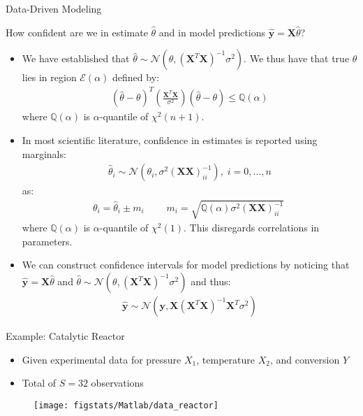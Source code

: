 \documentclass[9pt]{beamer}
\begin{document}
%
\begin{frame}{Data-Driven Modeling}

\begin{block}{}
How confident are we in estimate $\hat{\theta}$ and in model predictions $\hat{\mathbf{y}}=\mathbf{X}\hat{\theta}$?
\end{block}
\begin{itemize}
\item We have established that $\hat{\theta}\sim\mathcal{N}(\theta,(\mathbf{X}^T\mathbf{X})^{-1}\sigma^2)$.  We thus have that true $\theta$ lies in region $\mathcal{E}(\alpha)$ defined by:
\begin{align*}
(\hat{\theta}-\theta)^T\left(\frac{\mathbf{X}^T\mathbf{X}}{\sigma^2}\right)(\hat{\theta}-\theta)\leq \mathbb{Q}(\alpha)
\end{align*}
where $\mathbb{Q}(\alpha)$ is $\alpha$-quantile of $\chi^2(n+1)$.  

\item In most scientific literature, confidence in estimates is reported using marginals:
\begin{align*}
\hat{\theta}_i\sim \mathcal{N}(\theta_i,\sigma^2(\mathbf{X}\mathbf{X})^{-1}_{ii}),\; i=0,...,n
\end{align*}
as:
\begin{align*}
\theta_i=\hat{\theta}_i\pm m_i\;\qquad m_i=\sqrt{\mathbb{Q}(\alpha)\sigma^2(\mathbf{X}\mathbf{X})^{-1}_{ii}}\;
\end{align*}
where  $\mathbb{Q}(\alpha)$ is $\alpha$-quantile of $\chi^2(1)$. This disregards correlations in parameters. 
\item We can construct confidence intervals for model predictions by noticing that $\mathbf{\hat{y}}=\mathbf{X}\hat{\theta}$ and $\hat{\theta}\sim\mathcal{N}(\theta,(\mathbf{X}^T\mathbf{X})^{-1}\sigma^2)$ and thus:
\begin{align*}
\hat{\mathbf{y}}\sim \mathcal{N}(\mathbf{y},\mathbf{X}(\mathbf{X}^T\mathbf{X})^{-1}\mathbf{X}^T\sigma^2)
\end{align*} 
\end{itemize}
\end{frame}

%
\begin{frame}{Example: Catalytic Reactor}

\begin{block}{}
\begin{itemize}
\item Given experimental data for pressure $X_1$, temperature $X_2$, and conversion $Y$ 
\item Total of $S=32$ observations
\end{itemize}
\end{block}


\begin{figure}[!htb]
    \centering
	\texttt{[image: figstats/Matlab/data\_reactor]}
\end{figure}

\end{frame}
\end{document}
